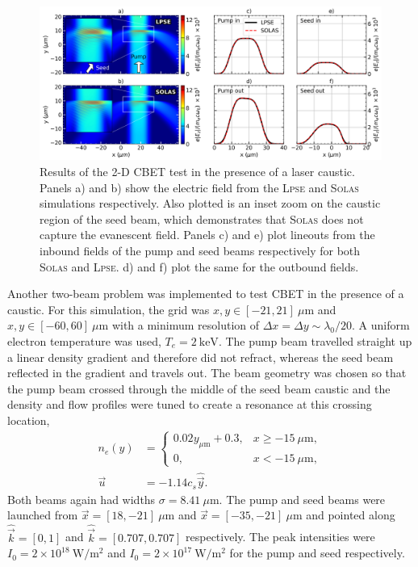 \begin{figure}[t!]
    \includegraphics[width=1.0\linewidth]{Numerics/Images/caustic_CBET_test.png}
    \centering
    \caption{Results of the 2-D \ac{CBET} test in the presence of a laser caustic.
    Panels a) and b) show the electric field from the \textsc{Lpse} and \textsc{Solas} simulations respectively.
    Also plotted is an inset zoom on the caustic region of the seed beam, which demonstrates that \textsc{Solas} does not capture the evanescent field.
    Panels c) and e) plot lineouts from the inbound fields of the pump and seed beams respectively for both \textsc{Solas} and \textsc{Lpse}.
    d) and f) plot the same for the outbound fields.}%
    \label{fig:SOLAS_CBET_test_caustics}
\end{figure}

Another two-beam problem was implemented to test \ac{CBET} in the presence of a caustic.
For this simulation, the grid was $x,y \in [-21,21]\ \mu\text{m}$ and $x,y \in [-60,60]\ \mu\text{m}$ with a minimum resolution of $\Delta x = \Delta y \sim \lambda_0/20$.
A uniform electron temperature was used, $T_e=2\ \text{keV}$.
The pump beam travelled straight up a linear density gradient and therefore did not refract, whereas the seed beam reflected in the gradient and travels out.
The beam geometry was chosen so that the pump beam crossed through the middle of the seed beam caustic and the density and flow profiles were tuned to create a resonance at this crossing location,
\begin{align}
    n_e(y) &= 
    \begin{cases}
        0.02y_{\mu\text{m}} + 0.3, & x\geq -15\ \mu\text{m},\\
        0,              & x<-15\ \mu\text{m},
    \end{cases} \\
    \vec{u} &= -1.14 c_s \hat{\vec{y}}.
\end{align}
Both beams again had widths $\sigma=8.41\ \mu\text{m}$.
The pump and seed beams were launched from $\vec{x}=[18,-21]\ \mu\text{m}$ and $\vec{x}=[-35,-21]\ \mu\text{m}$ and pointed along $\hat{\vec{k}}=[0,1]$ and $\hat{\vec{k}}=[0.707,0.707]$ respectively.
The peak intensities were $I_0=2\times10^{18}\ \text{W}/\text{m}^2$ and $I_0=2\times10^{17}\ \text{W}/\text{m}^2$ for the pump and seed respectively.

